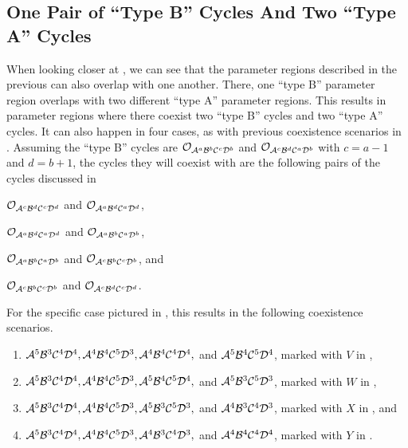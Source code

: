 \subsection{One Pair of ``Type B'' Cycles And Two ``Type A'' Cycles}

When looking closer at , we can see that the parameter regions described in the previous  can also overlap with one another.
There, one ``type B'' parameter region overlaps with two different ``type A'' parameter regions.
This results in parameter regions where there coexist two ``type B'' cycles and two ``type A'' cycles.
It can also happen in four cases, as with previous coexistence scenarios in .
Assuming the ``type B'' cycles are $\Cycle{\A^a\B^b\C^c\D^b}$ and $\Cycle{\A^c\B^d\C^a\D^b}$ with $c = a - 1$ and $d = b + 1$, the cycles they will coexist with are the following pairs of the cycles discussed in 
\begin{enumerate*}
	\item $\Cycle{\A^c\B^d\C^c\D^d}$ and $\Cycle{\A^a\B^d\C^a\D^d}$,
	\item $\Cycle{\A^a\B^d\C^a\D^d}$ and $\Cycle{\A^a\B^b\C^a\D^b}$,
	\item $\Cycle{\A^a\B^b\C^a\D^b}$ and $\Cycle{\A^c\B^b\C^c\D^b}$, and
	\item $\Cycle{\A^c\B^b\C^c\D^b}$ and $\Cycle{\A^c\B^d\C^c\D^d}$.
\end{enumerate*}
For the specific case pictured in , this results in the following coexistence scenarios.
\begin{enumerate}
	\item $\A^5\B^3\C^4\D^4, \A^4\B^4\C^5\D^3, \A^4\B^4\C^4\D^4,$ and $\A^5\B^4\C^5\D^4$, marked with $V$ in ,
	\item $\A^5\B^3\C^4\D^4, \A^4\B^4\C^5\D^3, \A^5\B^4\C^5\D^4,$ and $\A^5\B^3\C^5\D^3$, marked with $W$ in ,
	\item $\A^5\B^3\C^4\D^4, \A^4\B^4\C^5\D^3, \A^5\B^3\C^5\D^3,$ and $\A^4\B^3\C^4\D^3$, marked with $X$ in , and
	\item $\A^5\B^3\C^4\D^4, \A^4\B^4\C^5\D^3, \A^4\B^3\C^4\D^3,$ and $\A^4\B^4\C^4\D^4$, marked with $Y$ in .
\end{enumerate}

